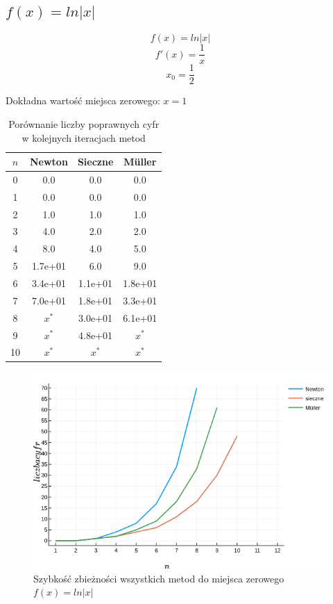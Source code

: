 \documentclass[12pt]{article}
\begin{document}
\subsection{$f(x) = ln|x|$}

\[f(x) = ln|x|\]
\[f'(x) = \frac{1}{x}\]
\[x_0 = \frac{1}{2}\]
\begin{center}
    Dokładna wartość miejsca zerowego: $x = 1$
\end{center}

\begin{table}[H]
\centering
\begin{tabular}{|c|c|c|c|}
    \hline
    $n$ & Newton & Sieczne & Müller     \\ \hline\hline
    0  &  0.0     &  0.0     &  0.0     \\ \hline
    1  &  0.0     &  0.0     &  0.0     \\ \hline
    2  &  1.0     &  1.0     &  1.0     \\ \hline
    3  &  4.0     &  2.0     &  2.0     \\ \hline
    4  &  8.0     &  4.0     &  5.0     \\ \hline
    5  &  1.7e+01 &  6.0     &  9.0     \\ \hline
    6  &  3.4e+01 &  1.1e+01 &  1.8e+01 \\ \hline
    7  &  7.0e+01 &  1.8e+01 &  3.3e+01 \\ \hline
    8  &  $x^*$   &  3.0e+01 &  6.1e+01 \\ \hline
    9  &  $x^*$   &  4.8e+01 &  $x^*$   \\ \hline
    10 &  $x^*$   &  $x^*$   &  $x^*$   \\ \hline
\end{tabular}
\caption{Porównanie liczby poprawnych cyfr w kolejnych iteracjach metod}
\label{table:table5}
\end{table}

\begin{figure}[H]
    \centering
    \includegraphics[scale=0.7]{plot5.png}
\caption{Szybkość zbieżności wszystkich metod do miejsca 
            zerowego $f(x) = ln|x|$}
\label{figure:plot5}
\end{figure}
\end{document}

